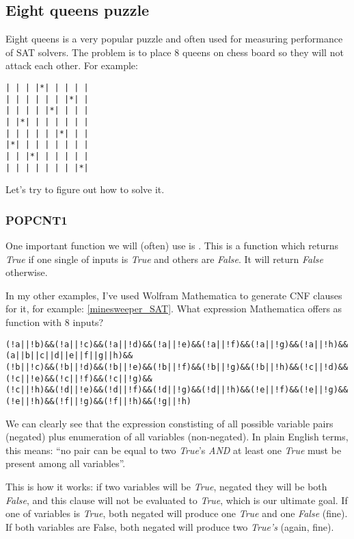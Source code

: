 \subsection{Eight queens puzzle}
\label{EightQueens}

Eight queens is a very popular puzzle and often used for measuring performance of SAT solvers.
The problem is to place 8 queens on chess board so they will not attack each other.
For example:

\begin{lstlisting}
| | | |*| | | | |
| | | | | | |*| |
| | | | |*| | | |
| |*| | | | | | |
| | | | | |*| | |
|*| | | | | | | |
| | |*| | | | | |
| | | | | | | |*|
\end{lstlisting}

Let's try to figure out how to solve it.

\subsubsection{POPCNT1}
\label{POPCNTOne}

One important function we will (often) use is .
This is a function which returns \textit{True} if one single of inputs is \textit{True} and others are \textit{False}.
It will return \textit{False} otherwise.

In my other examples, I've used Wolfram Mathematica to generate CNF clauses for it, for example: \ref{minesweeper_SAT}.
What expression Mathematica offers as  function with 8 inputs?

\begin{lstlisting}
(!a||!b)&&(!a||!c)&&(!a||!d)&&(!a||!e)&&(!a||!f)&&(!a||!g)&&(!a||!h)&&(a||b||c||d||e||f||g||h)&&
(!b||!c)&&(!b||!d)&&(!b||!e)&&(!b||!f)&&(!b||!g)&&(!b||!h)&&(!c||!d)&&(!c||!e)&&(!c||!f)&&(!c||!g)&&
(!c||!h)&&(!d||!e)&&(!d||!f)&&(!d||!g)&&(!d||!h)&&(!e||!f)&&(!e||!g)&&(!e||!h)&&(!f||!g)&&(!f||!h)&&(!g||!h)
\end{lstlisting}

We can clearly see that the expression constisting of all possible variable pairs (negated) plus
enumeration of all variables (non-negated).
In plain English terms, this means: ``no pair can be equal to two \textit{True}'s \textit{AND} at least one \textit{True}
must be present among all variables''.

This is how it works: if two variables will be \textit{True}, negated they will be both \textit{False},
and this clause will not be evaluated
to \textit{True}, which is our ultimate goal.
If one of variables is \textit{True}, both negated will produce one \textit{True} and one \textit{False} (fine).
If both variables are False, both negated will produce two \textit{True's} (again, fine).

